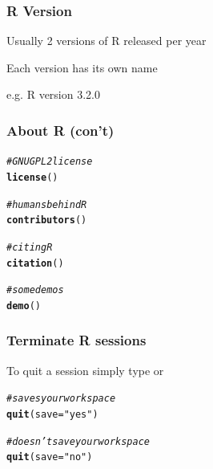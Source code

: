 \documentclass[12pt]{beamer}\usepackage[]{graphicx}\usepackage[]{color}
\makeatletter
\newcommand{\hlstr}[1]{\textcolor[rgb]{0.192,0.494,0.8}{#1}}%
\newcommand{\hlcom}[1]{\textcolor[rgb]{0.678,0.584,0.686}{\textit{#1}}}%
\newcommand{\hlstd}[1]{\textcolor[rgb]{0.345,0.345,0.345}{#1}}%
\newcommand{\hlkwc}[1]{\textcolor[rgb]{0.333,0.667,0.333}{#1}}%
\newcommand{\hlkwd}[1]{\textcolor[rgb]{0.737,0.353,0.396}{\textbf{#1}}}%
\newenvironment{kframe}{%
 \def\at@end@of@kframe{}%
 \ifinner\ifhmode%
  \def\at@end@of@kframe{\end{minipage}}%
  \begin{minipage}{\columnwidth}%
 \fi\fi%
 \def\FrameCommand##1{\hskip\@totalleftmargin \hskip-\fboxsep
 \colorbox{shadecolor}{##1}\hskip-\fboxsep
     \hskip-\linewidth \hskip-\@totalleftmargin \hskip\columnwidth}%
 \MakeFramed {\advance\hsize-\width
   \@totalleftmargin\z@ \linewidth\hsize
   \@setminipage}}%
 {\par\unskip\endMakeFramed%
 \at@end@of@kframe}
\newenvironment{knitrout}{}{} %
\makeatother
\begin{document}

\begin{frame}
\frametitle{R Version}

\bi
  \item Usually 2 versions of R released per year
  \item Each version has its own name
  \item e.g. R version 3.2.0 
\ei

\end{frame}


\begin{frame}[fragile]
\frametitle{About R (con't)}

\begin{knitrout}\footnotesize
{}\color{fgcolor}\begin{kframe}
\begin{alltt}
\hlcom{# GNU GPL2 license}
\hlkwd{license}\hlstd{()}

\hlcom{# humans behind R}
\hlkwd{contributors}\hlstd{()}

\hlcom{# citing R}
\hlkwd{citation}\hlstd{()}

\hlcom{# some demos}
\hlkwd{demo}\hlstd{()}
\end{alltt}
\end{kframe}
\end{knitrout}

\end{frame}


\begin{frame}[fragile]
\frametitle{Terminate R sessions}

To quit a session simply type  or 
\begin{knitrout}\footnotesize
{}\color{fgcolor}\begin{kframe}
\begin{alltt}
\hlcom{# saves your workspace}
\hlkwd{quit}\hlstd{(}\hlkwc{save} \hlstd{=} \hlstr{"yes"}\hlstd{)}
\end{alltt}
\end{kframe}
\end{knitrout}

\begin{knitrout}\footnotesize
{}\color{fgcolor}\begin{kframe}
\begin{alltt}
\hlcom{# doesn't save your workspace}
\hlkwd{quit}\hlstd{(}\hlkwc{save} \hlstd{=} \hlstr{"no"}\hlstd{)}
\end{alltt}
\end{kframe}
\end{knitrout}

\end{frame}
\end{document}
